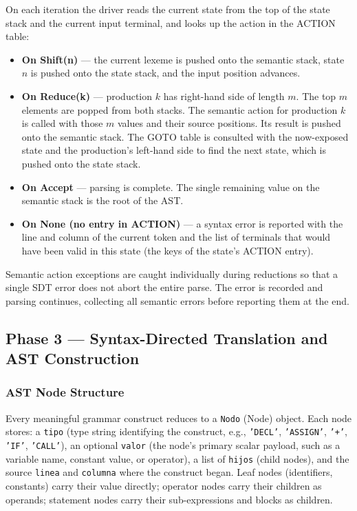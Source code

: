 \documentclass[letterpaper,12pt,oneside]{article}
\begin{document}
On each iteration the driver reads the current state from the top of the state stack and the current input terminal, and looks up the action in the ACTION table:
\begin{itemize}
    \item \textbf{On Shift(n)} --- the current lexeme is pushed onto the semantic stack, state $n$ is pushed onto the state stack, and the input position advances.
    \item \textbf{On Reduce(k)} --- production $k$ has right-hand side of length $m$. The top $m$ elements are popped from both stacks. The semantic action for production $k$ is called with those $m$ values and their source positions. Its result is pushed onto the semantic stack. The GOTO table is consulted with the now-exposed state and the production's left-hand side to find the next state, which is pushed onto the state stack.
    \item \textbf{On Accept} --- parsing is complete. The single remaining value on the semantic stack is the root of the AST.
    \item \textbf{On None (no entry in ACTION)} --- a syntax error is reported with the line and column of the current token and the list of terminals that would have been valid in this state (the keys of the state's ACTION entry).
\end{itemize}
Semantic action exceptions are caught individually during reductions so that a single SDT error does not abort the entire parse. The error is recorded and parsing continues, collecting all semantic errors before reporting them at the end.

\subsection{Phase 3 --- Syntax-Directed Translation and AST Construction}

\subsubsection{AST Node Structure}
Every meaningful grammar construct reduces to a \texttt{Nodo} (Node) object. Each node stores: a \texttt{tipo} (type string identifying the construct, e.g., \texttt{'DECL'}, \texttt{'ASSIGN'}, \texttt{'+'}, \texttt{'IF'}, \texttt{'CALL'}), an optional \texttt{valor} (the node's primary scalar payload, such as a variable name, constant value, or operator), a list of \texttt{hijos} (child nodes), and the source \texttt{linea} and \texttt{columna} where the construct began. Leaf nodes (identifiers, constants) carry their value directly; operator nodes carry their children as operands; statement nodes carry their sub-expressions and blocks as children.
\end{document}
